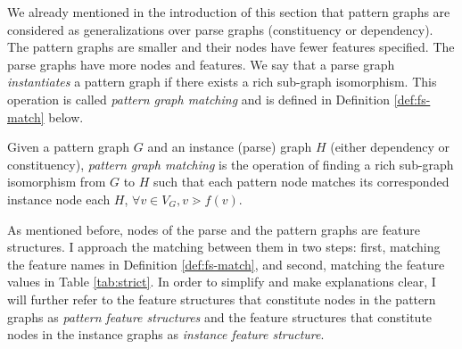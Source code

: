 %    

%

We already mentioned in the introduction of this section that pattern graphs are considered as generalizations over parse graphs (constituency or dependency). The pattern graphs are smaller and their nodes have fewer features specified. The parse graphs have more nodes and features. We say that a parse graph \textit{instantiates} a pattern graph if there exists a rich sub-graph isomorphism. This operation is called \textit{pattern graph matching} and is defined in Definition \ref{def:fs-match} below. 

\begin{definition}\label{def:pgmatching}
    Given a pattern graph $G$ and an instance (parse) graph $H$ (either dependency or constituency), \textit{pattern graph matching} is the operation of finding a rich sub-graph isomorphism from $G$ to $H$ such that each pattern node matches its corresponded instance node each $H$, $\forall v \in V_G, v \gtrdot f(v)$.
\end{definition}


As mentioned before, nodes of the parse and the pattern graphs are feature structures. I approach the matching between them in two steps: first, matching the feature names in Definition \ref{def:fs-match}, and second,  matching the feature values in Table \ref{tab:strict}. 
In order to simplify and make explanations clear, I will further refer to the feature structures that constitute nodes in the pattern graphs as \textit{pattern feature structures} and the feature structures that constitute nodes in the instance graphs as \textit{instance feature structure}.

